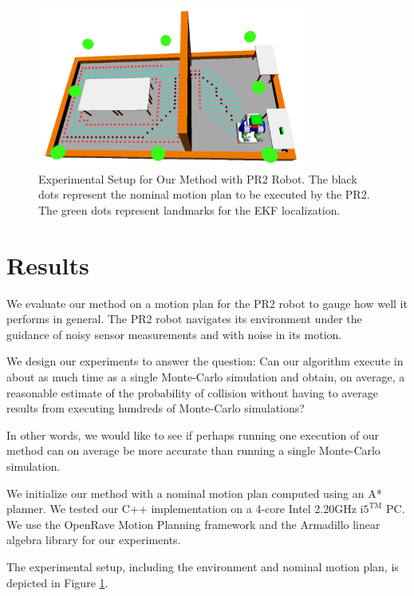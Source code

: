 \documentclass[journal]{IEEEtran}
\begin{document}
\begin{figure}[!t]
\centering
\includegraphics[width=3.5in]{env_setup.png}
\caption{Experimental Setup for Our Method with PR2 Robot. The black dots represent the nominal motion plan to be executed by the PR2. The green dots represent landmarks for the EKF localization.}
\label{pr2_setup}
\end{figure}


\section{Results}
We evaluate our method on a motion plan for the PR2 robot to gauge how well it performs in general. The PR2 robot navigates its environment under the guidance of noisy sensor measurements and with noise in its motion.

We design our experiments to answer the question: Can our algorithm execute in about as much time as a single Monte-Carlo simulation and obtain, on average, a reasonable estimate of the probability of collision without having to average results from executing hundreds of Monte-Carlo simulations?

In other words, we would like to see if perhaps running one execution of our method can on average be more accurate than running a single Monte-Carlo simulation.

We initialize our method with a nominal motion plan computed using an A* planner. We tested our C++ implementation on a 4-core Intel 2.20GHz $\text{i5}^{\text{TM}}$ PC. We use the OpenRave Motion Planning framework and the Armadillo linear algebra library \cite{IEEEhowto:sanderson} for our experiments.

The experimental setup, including the environment and nominal motion plan, is depicted in Figure \ref{pr2_setup}.
\end{document}
